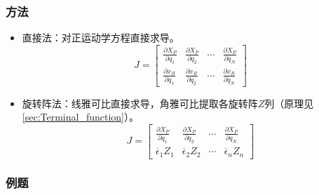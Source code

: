 \documentclass[
12pt, %
a4paper, 
oneside, %
headinclude,footinclude, %
]{scrartcl}
\begin{document}
\subsubsection[方法]{方法}
\begin{itemize}
\item 直接法：对正运动学方程直接求导。
$$ J = \begin{bmatrix} \frac{\partial X_P}{\partial q_1} & \frac{\partial X_P}{\partial q_2} & \cdots & \frac{\partial X_P}{\partial q_N} \\ \frac{\partial x_R}{\partial q_1} & \frac{\partial x_R}{\partial q_2} & \cdots & \frac{\partial x_R}{\partial q_N} \end{bmatrix} $$
\item 旋转阵法：线雅可比直接求导，角雅可比提取各旋转阵$ Z $列（原理见\ref{sec:Terminal_function}）。\label{sec:Terminal_function_back}
$$ J = \begin{bmatrix} \frac{\partial X_P}{\partial q_1} & \frac{\partial X_P}{\partial q_2} & \cdots & \frac{\partial X_P}{\partial q_N} \\ \overline{\epsilon}_1 Z_1 & \overline{\epsilon}_2 Z_2 & \cdots & \overline{\epsilon}_n Z_n \end{bmatrix} $$
\end{itemize} 
\subsubsection[例题]{例题}
\end{document}
